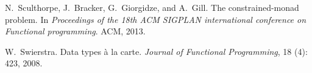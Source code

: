 \documentclass{sigplanconf}
\begin{document}
\begin{thebibliography}{9}
N.~Sculthorpe, J.~Bracker, G.~Giorgidze, and A.~Gill.
\newblock The constrained-monad problem.
\newblock In \emph{Proceedings of the 18th ACM SIGPLAN international conference
  on Functional programming}. ACM, 2013.

W.~Swierstra.
\newblock Data types \`{a} la carte.
\newblock \emph{Journal of Functional Programming}, 18 (4):
  423, 2008.

\end{thebibliography}

% 



\end{document}
